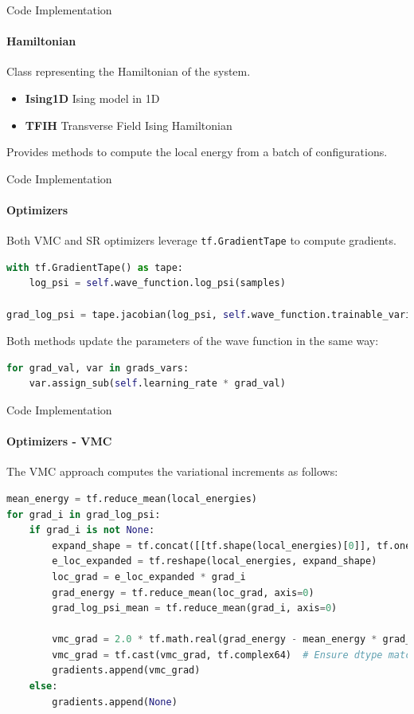 \documentclass{beamer}
\begin{document}
\begin{frame}{Code Implementation}
\framesubtitle{Hamiltonian}
Class representing the Hamiltonian of the system.
\begin{itemize}
    \item \textbf{Ising1D} Ising model in 1D
    \item \textbf{TFIH} Transverse Field Ising Hamiltonian
\end{itemize}

Provides methods to compute the local energy from a batch of configurations.

\end{frame}

\begin{frame}[fragile]{Code Implementation}
\framesubtitle{Optimizers}
Both VMC and SR optimizers leverage \lstinline[style=kaolstplain]|tf.GradientTape| to compute gradients.
\begin{lstlisting}[language=Python, style=kaolstplain]
with tf.GradientTape() as tape:
	log_psi = self.wave_function.log_psi(samples)

grad_log_psi = tape.jacobian(log_psi, self.wave_function.trainable_variables)
\end{lstlisting}
\baselineskip

Both methods update the parameters of the wave function in the same way:
\begin{lstlisting}[language=Python, style=kaolstplain]
for grad_val, var in grads_vars:
	var.assign_sub(self.learning_rate * grad_val)
\end{lstlisting}
\end{frame}

\begin{frame}[fragile]{Code Implementation}
\framesubtitle{Optimizers - VMC}
The VMC approach computes the variational increments as follows:
\begin{lstlisting}[language=Python, style=kaolstplain]
mean_energy = tf.reduce_mean(local_energies)
for grad_i in grad_log_psi:
	if grad_i is not None:
		expand_shape = tf.concat([[tf.shape(local_energies)[0]], tf.ones(tf.rank(grad_i) - 1, dtype=tf.int32)], axis=0)
		e_loc_expanded = tf.reshape(local_energies, expand_shape)
		loc_grad = e_loc_expanded * grad_i
		grad_energy = tf.reduce_mean(loc_grad, axis=0)
		grad_log_psi_mean = tf.reduce_mean(grad_i, axis=0)

		vmc_grad = 2.0 * tf.math.real(grad_energy - mean_energy * grad_log_psi_mean)
		vmc_grad = tf.cast(vmc_grad, tf.complex64)  # Ensure dtype matches variable
		gradients.append(vmc_grad)
	else:
		gradients.append(None)
\end{lstlisting}
\end{frame}
\end{document}
